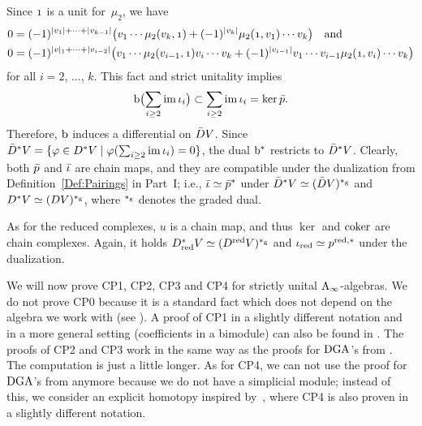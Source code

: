 \documentclass[\MainFolder/Text.tex]{subfiles}
\begin{document}
\begin{Remark}
Since $\NOne$ is a unit for~$\mu_2$, we have
\begin{align*}
0 & = (-1)^{\Abs{v_1} + \dotsb + \Abs{v_{k-1}}}\bigl(v_1 \dotsb \mu_2(v_k, \NOne) + (-1)^{\Abs{v_k}}\mu_2(\NOne,v_1)\dotsb v_k \bigr)\quad\text{and}\\
0 & = (-1)^{\Abs{v}_1 + \dotsb + \Abs{v_{i-2}}}\bigl(v_1 \dotsb \mu_2(v_{i-1}, \NOne) v_i \dotsb v_k + (-1)^{\Abs{v_{i-1}}} v_1 \dotsb  v_{i-1}\mu_2(\NOne, v_i) \dotsb v_k \bigr)
\end{align*}
for all $i=2$, $\dotsc$, $k$. This fact and strict unitality implies
$$ \mathrm{b}\bigl(\sum_{i\ge 2}\operatorname{im} \iota_i\bigr)\subset\sum_{i\ge 2}\operatorname{im} \iota_i = \ker \bar{p}.$$
Therefore, $\mathrm{b}$ induces a differential on $\bar{D} V$. Since $\bar{D}^* V = \{\varphi\in D^*V \mid \varphi(\sum_{i\ge 2}\operatorname{im}\iota_i) = 0\}$, the dual $\mathrm{b}^*$ restricts to $\bar{D}^* V$. Clearly, both $\bar{p}$ and $\bar{\iota}$ are chain maps, and they are compatible under the dualization from Definition~\ref{Def:Pairings} in Part~I; i.e., $\bar{\iota} \simeq \bar{p}^*$ under $\bar{D}^* V \simeq (\bar{D} V)^{*_{\mathrm{g}}}$ and $D^* V \simeq (D V)^{*_{\mathrm{g}}}$, where $^{*_{\mathrm{g}}}$ denotes the graded dual.
 
As for the reduced complexes, $u$ is a chain map, and thus $\ker$ and $\operatorname{\mathrm{coker}}$ are chain complexes. Again, it holds $D_{\mathrm{red}}^* V \simeq (D^{\mathrm{red}} V)^{*_{\mathrm{g}}}$ and $\iota_{\mathrm{red}} \simeq p^{\mathrm{red},*}$ under the dualization.
\end{Remark}

We will now prove CP1, CP2, CP3 and CP4 for strictly unital $\mathrm{A}_\infty$-algebras. We do not prove CP0 because it is a standard fact which does not depend on the algebra we work with (see \cite{LodayCyclic}). A proof of CP1 in a slightly different notation and in a more general setting (coefficients in a bimodule) can also be found in \cite{Mescher2016}. The proofs of CP2 and CP3 work in the same way as the proofs for $\mathrm{DGA}$'s from \cite{LodayCyclic}. The computation is just a little longer. As for CP4, we can not use the proof for $\mathrm{DGA}$'s from \cite[Proposition~1.6.5]{LodayCyclic} anymore because we do not have a simplicial module; instead of this, we consider an explicit homotopy inspired by~\cite{Lazarev2003}, where CP4 is also proven in a slightly different notation.
\end{document}
